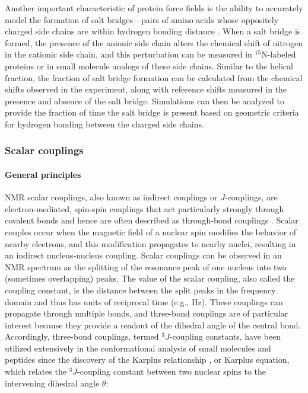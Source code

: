 \documentclass[9pt,review,pubversion]{livecoms}
\begin{document}
Another important characteristic of protein force fields is the ability to accurately model the formation of salt bridges---pairs of amino acids whose oppositely charged side chains are within hydrogen bonding distance \cite{donald_salt_2011}.
When a salt bridge is formed, the presence of the anionic side chain alters the chemical shift of nitrogen in the cationic side chain, and this perturbation can be measured in $^{15}$N-labeled proteins \cite{tomlinson2009characterization} or in small molecule analogs of these side chains.
Similar to the helical fraction, the fraction of salt bridge formation can be calculated from the chemical shifts observed in the experiment, along with reference shifts measured in the presence and absence of the salt bridge.
Simulations can then be analyzed to provide the fraction of time the salt bridge is present based on geometric criteria for hydrogen bonding between the charged side chains.

\newpage
\subsubsection{Scalar couplings}
\label{sub2:j_coupling}

\paragraph{General principles}

NMR scalar couplings, also known as indirect couplings or $J$-couplings, are electron-mediated, spin-spin couplings that act particularly strongly through covalent bonds and hence are often described as through-bond couplings \cite{karplus_contact_1959,karplus_vicinal_1963}.
Scalar couples occur when the magnetic field of a nuclear spin modifies the behavior of nearby electrons, and this modification propagates to nearby nuclei, resulting in an indirect nucleus-nucleus coupling.
Scalar couplings can be observed in an NMR spectrum as the splitting of the resonance peak of one nucleus into two (sometimes overlapping) peaks.
The value of the scalar coupling, also called the coupling constant, is the distance between the split peaks in the frequency domain and thus has units of reciprocal time (e.g., Hz).
These couplings can propagate through multiple bonds, and three-bond couplings are of particular interest because they provide a readout of the dihedral angle of the central bond. Accordingly, three-bond couplings, termed $^3J$-coupling constants, have been utilized extensively in the conformational analysis of small molecules \cite{karplus_vicinal_1963} and peptides \cite{bystrov_spinspin_1976} since the discovery of the Karplus relationship \cite{karplus_contact_1959}, or Karplus equation, which relates the $^3J$-coupling constant between two nuclear spins to the intervening dihedral angle $\theta$:
\end{document}
